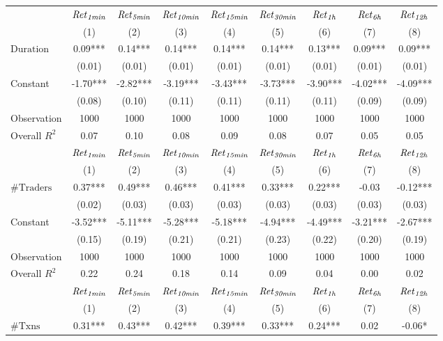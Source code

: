 \begin{tabular}{lcccccccc}
\hline
 & ${\it Ret}_{\it 1min}$ & ${\it Ret}_{\it 5min}$ & ${\it Ret}_{\it 10min}$ & ${\it Ret}_{\it 15min}$ & ${\it Ret}_{\it 30min}$ & ${\it Ret}_{\it 1h}$ & ${\it Ret}_{\it 6h}$ & ${\it Ret}_{\it 12h}$ \\
 & (1) & (2) & (3) & (4) & (5) & (6) & (7) & (8) \\
\hline
$\mathrm{Duration}$ & 0.09*** & 0.14*** & 0.14*** & 0.14*** & 0.14*** & 0.13*** & 0.09*** & 0.09*** \\
 & (0.01) & (0.01) & (0.01) & (0.01) & (0.01) & (0.01) & (0.01) & (0.01) \\
Constant & -1.70*** & -2.82*** & -3.19*** & -3.43*** & -3.73*** & -3.90*** & -4.02*** & -4.09*** \\
 & (0.08) & (0.10) & (0.11) & (0.11) & (0.11) & (0.11) & (0.09) & (0.09) \\
Observation & 1000 & 1000 & 1000 & 1000 & 1000 & 1000 & 1000 & 1000 \\
Overall $R^2$ & 0.07 & 0.10 & 0.08 & 0.09 & 0.08 & 0.07 & 0.05 & 0.05 \\
\hline
 & ${\it Ret}_{\it 1min}$ & ${\it Ret}_{\it 5min}$ & ${\it Ret}_{\it 10min}$ & ${\it Ret}_{\it 15min}$ & ${\it Ret}_{\it 30min}$ & ${\it Ret}_{\it 1h}$ & ${\it Ret}_{\it 6h}$ & ${\it Ret}_{\it 12h}$ \\
 & (1) & (2) & (3) & (4) & (5) & (6) & (7) & (8) \\
\hline
$\mathrm{\#Traders}$ & 0.37*** & 0.49*** & 0.46*** & 0.41*** & 0.33*** & 0.22*** & -0.03 & -0.12*** \\
 & (0.02) & (0.03) & (0.03) & (0.03) & (0.03) & (0.03) & (0.03) & (0.03) \\
Constant & -3.52*** & -5.11*** & -5.28*** & -5.18*** & -4.94*** & -4.49*** & -3.21*** & -2.67*** \\
 & (0.15) & (0.19) & (0.21) & (0.21) & (0.23) & (0.22) & (0.20) & (0.19) \\
Observation & 1000 & 1000 & 1000 & 1000 & 1000 & 1000 & 1000 & 1000 \\
Overall $R^2$ & 0.22 & 0.24 & 0.18 & 0.14 & 0.09 & 0.04 & 0.00 & 0.02 \\
\hline
 & ${\it Ret}_{\it 1min}$ & ${\it Ret}_{\it 5min}$ & ${\it Ret}_{\it 10min}$ & ${\it Ret}_{\it 15min}$ & ${\it Ret}_{\it 30min}$ & ${\it Ret}_{\it 1h}$ & ${\it Ret}_{\it 6h}$ & ${\it Ret}_{\it 12h}$ \\
 & (1) & (2) & (3) & (4) & (5) & (6) & (7) & (8) \\
\hline
$\mathrm{\#Txns}$ & 0.31*** & 0.43*** & 0.42*** & 0.39*** & 0.33*** & 0.24*** & 0.02 & -0.06* \\

\end{tabular}
